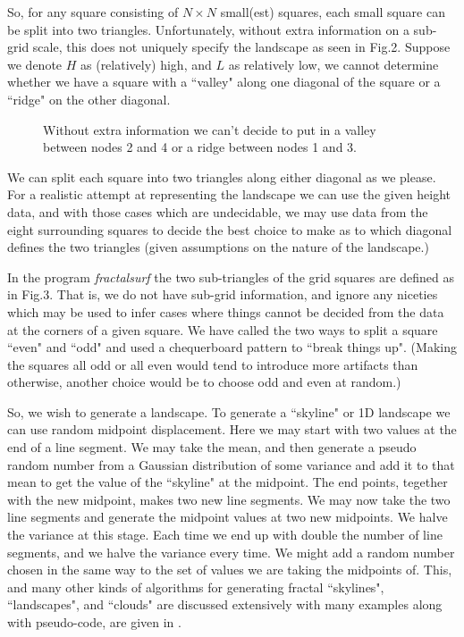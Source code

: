 \documentclass[12pt]{article}
\begin{document}
So, for any square consisting of $N\times N$ small(est) squares, each small square 
can be split into two triangles. Unfortunately, without extra information on a sub-grid scale, this 
does not uniquely specify the landscape as seen in Fig.2. Suppose we denote $H$ as (relatively) high, and
 $L$ as relatively low, we cannot determine whether we have a square with a ``valley" along one diagonal
of the square or a ``ridge" on the other diagonal.
\begin{figure}[htb]
\vspace*{10cm}
\caption{ Without extra information we can't decide to put in a valley between nodes 2 and 4 or a ridge between 
nodes 1 and 3.}
\end{figure}

We can split each square into two triangles along either diagonal as we please. For a realistic attempt at 
representing the landscape we can use the given height data, and with those cases which are undecidable, we may
use data from the eight surrounding squares to decide the best choice to make as to which 
diagonal defines the two triangles (given assumptions on the nature of
the landscape.) 

In the program {\it fractalsurf} the two sub-triangles of the grid squares are defined as in Fig.3.
That is, we do not have sub-grid information, and ignore any niceties which may be used to infer cases
where things cannot be decided from the data at the corners of a given square. We have called the two ways
to split a square ``even" and ``odd" and used a chequerboard pattern to ``break things up". (Making the squares 
 all odd or all even
would tend to introduce more artifacts than otherwise, another choice would be to choose odd and even at random.)

So, we wish to generate a landscape. To generate a ``skyline" or 1D landscape  we can use random midpoint
 displacement\cite{Fractals:Mybib}.
Here we may start with two values at the end of a line segment. We may take the mean, and then generate
a pseudo random number from a Gaussian distribution of some variance and add it to that mean to get the
value of the ``skyline" at the midpoint. The end points, tegether with the new midpoint, makes two new
 line segments.
We may now take the two line segments
and generate the midpoint values at two new midpoints. We halve the variance at this stage. Each time
we end up with double the number of line segments, and we halve the variance every time. We might add
 a random number chosen in the same way to the set of values we are taking the midpoints of.
This, and many other kinds of algorithms for generating fractal ``skylines", ``landscapes", and ``clouds"
are discussed extensively with many examples along with pseudo-code, are given in \cite{Fractals:Mybib}.
\end{document}
